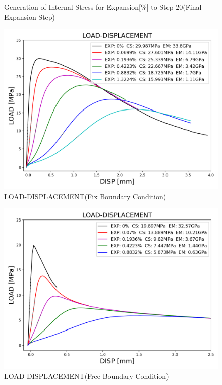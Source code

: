 \begin{figure}[ht!]
    

\caption{Generation of Internal Stress for Expansion[\%] to Step 20(Final Expansion Step)}
\label{fig:A30_stress}
\end{figure}


\begin{figure}[ht!]
    \centering
    \includegraphics[width=0.8\linewidth]{Files/exp_3D/ASR/S13A30P75FIX-LOAD-DISPLACEMENT.png}
    \caption{LOAD-DISPLACEMENT(Fix Boundary Condition)}
    \label{fig:S13A30P75FIX-LOAD-DISPLACEMENT}
\end{figure}

\begin{figure}[ht!]
    \centering
    \includegraphics[width=0.8\linewidth]{Files/exp_3D/ASR/S13A30P75FREE-LOAD-DISPLACEMENT.png}
    \caption{LOAD-DISPLACEMENT(Free Boundary Condition)}
    \label{fig:S13A30P75FREE-LOAD-DISPLACEMENT}
\end{figure}


